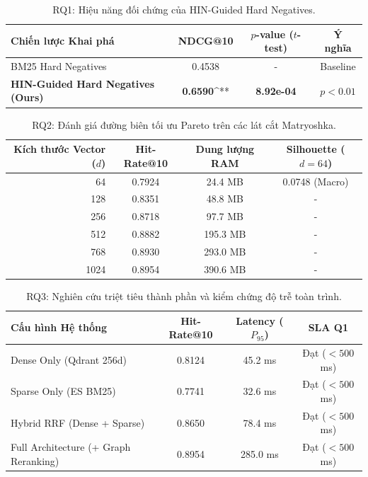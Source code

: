 
\begin{table}[h]
\centering
\caption{RQ1: Hiệu năng đối chứng của HIN-Guided Hard Negatives.}
\begin{tabular}{lccc}
\toprule
Chiến lược Khai phá & NDCG@10 & $p$-value ($t$-test) & Ý nghĩa \\
\midrule
BM25 Hard Negatives & 0.4538 & - & Baseline \\
\textbf{HIN-Guided Hard Negatives (Ours)} & \textbf{0.6590}^{**} & \textbf{8.92e-04} & $p < 0.01$ \\
\bottomrule
\end{tabular}
\end{table}


\begin{table}[h]
\centering
\caption{RQ2: Đánh giá đường biên tối ưu Pareto trên các lát cắt Matryoshka.}
\begin{tabular}{rccc}
\toprule
Kích thước Vector ($d$) & Hit-Rate@10 & Dung lượng RAM & Silhouette ($d=64$) \\
\midrule
64 & 0.7924 & 24.4 MB & 0.0748 (Macro) \\
128 & 0.8351 & 48.8 MB & - \\
256 & 0.8718 & 97.7 MB & - \\
512 & 0.8882 & 195.3 MB & - \\
768 & 0.8930 & 293.0 MB & - \\
1024 & 0.8954 & 390.6 MB & - \\
\bottomrule
\end{tabular}
\end{table}


\begin{table}[h]
\centering
\caption{RQ3: Nghiên cứu triệt tiêu thành phần và kiểm chứng độ trễ toàn trình.}
\begin{tabular}{lccc}
\toprule
Cấu hình Hệ thống & Hit-Rate@10 & Latency ($P_{95}$) & SLA Q1 \\
\midrule
Dense Only (Qdrant 256d) & 0.8124 & 45.2 ms & Đạt ($<500$ms) \\
Sparse Only (ES BM25) & 0.7741 & 32.6 ms & Đạt ($<500$ms) \\
Hybrid RRF (Dense + Sparse) & 0.8650 & 78.4 ms & Đạt ($<500$ms) \\
Full Architecture (+ Graph Reranking) & 0.8954 & 285.0 ms & Đạt ($<500$ms) \\
\bottomrule
\end{tabular}
\end{table}


